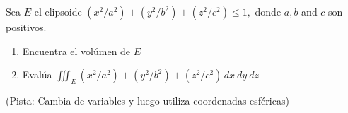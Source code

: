 Sea $E$ el elipsoide $(x^2 / a^2) + (y^2 / b^2) + (z^2 / c^2) \leq 1,$ donde $a, b$ and $c$ son positivos.

\begin{enumerate}[label=(\alph*), itemsep=0.4em, topsep=0.5em]
	\item Encuentra el volúmen de $E$
	\item Evalúa $\displaystyle \iiint_E (x^2 / a^2) + (y^2 / b^2) + (z^2 / c^2)\, dx \ dy \ dz$
\end{enumerate}
(Pista: Cambia de variables y luego utiliza coordenadas esféricas)
